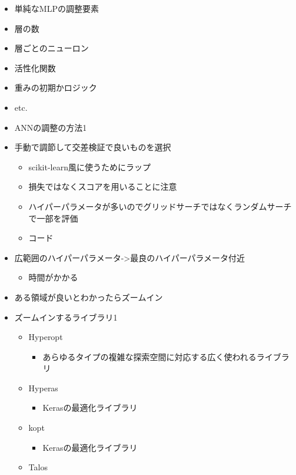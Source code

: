 \begin{itemize}
\item
  単純なMLPの調整要素
\item
  層の数
\item
  層ごとのニューロン
\item
  活性化関数
\item
  重みの初期かロジック
\item
  etc.
\item
  ANNの調整の方法1
\item
  手動で調節して交差検証で良いものを選択

  \begin{itemize}
  \tightlist
  \item
    scikit-learn風に使うためにラップ
  \item
    損失ではなくスコアを用いることに注意
  \item
    ハイパーパラメータが多いのでグリッドサーチではなくランダムサーチで一部を評価
  \item
    コード
  \end{itemize}
\item
  広範囲のハイパーパラメータ-\textgreater 最良のハイパーパラメータ付近

  \begin{itemize}
  \tightlist
  \item
    時間がかかる
  \end{itemize}
\item
  ある領域が良いとわかったらズームイン
\item
  ズームインするライブラリ1

  \begin{itemize}
  \tightlist
  \item
    Hyperopt

    \begin{itemize}
    \tightlist
    \item
      あらゆるタイプの複雑な探索空間に対応する広く使われるライブラリ
    \end{itemize}
  \item
    Hyperas

    \begin{itemize}
    \tightlist
    \item
      Kerasの最適化ライブラリ
    \end{itemize}
  \item
    kopt

    \begin{itemize}
    \tightlist
    \item
      Kerasの最適化ライブラリ
    \end{itemize}
  \item
    Talos


\end{itemize}
\end{itemize}
